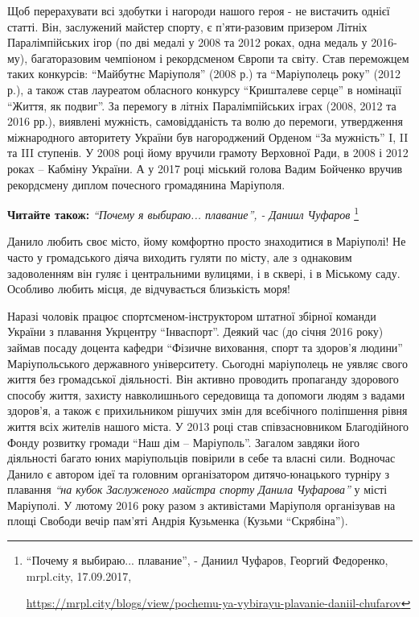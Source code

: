 
Щоб перерахувати всі здобутки і нагороди нашого героя - не вистачить однієї
статті. Він, заслужений майстер спорту, є п'яти\hyp{}разовим призером Літніх
Паралімпійських ігор (по дві медалі у 2008 та 2012 роках, одна медаль у
2016-му), багаторазовим чемпіоном і рекордсменом Європи та світу. Став
переможцем таких конкурсів: \enquote{Майбутнє Маріуполя} (2008 р.) та \enquote{Маріуполець
року} (2012 р.), а також став лауреатом обласного конкурсу \enquote{Кришталеве серце} в
номінації \enquote{Життя, як подвиг}. За перемогу в літніх Паралімпійських іграх (2008,
2012 та 2016 рр.), виявлені мужність, самовідданість та волю до перемоги,
утвердження міжнародного авторитету України був нагороджений Орденом \enquote{За
мужність} I, II та III ступенів. У 2008 році йому вручили грамоту Верховної
Ради, в 2008 і 2012 роках – Кабміну України. А у 2017 році міський голова Вадим
Бойченко вручив рекордсмену диплом почесного громадянина Маріуполя.

\textbf{Читайте також:} \emph{\enquote{Почему я выбираю... плавание}, - Даниил Чуфаров}%
\footnote{\enquote{Почему я выбираю... плавание}, - Даниил Чуфаров, Георгий Федоренко, mrpl.city, 17.09.2017, \par%
\url{https://mrpl.city/blogs/view/pochemu-ya-vybirayu-plavanie-daniil-chufarov}
}

Данило любить своє місто, йому комфортно просто знаходитися в Маріуполі! Не
часто у громадського діяча виходить гуляти по місту, але з однаковим
задоволенням він гуляє і центральними вулицями, і в сквері, і в Міському саду.
Особливо любить місця, де відчувається близькість моря!


Наразі чоловік працює спортсменом-інструктором штатної збірної команди України
з плавання Укрцентру \enquote{Інваспорт}. Деякий час (до січня 2016 року) займав посаду
доцента кафедри \enquote{Фізичне виховання, спорт та здоров'я людини} Маріупольського
державного університету. Сьогодні маріуполець не уявляє свого життя без
громадської діяльності. Він активно проводить пропаганду здорового способу
життя, захисту навколишнього середовища та допомоги людям з вадами здоров'я, а
також є прихильником рішучих змін для всебічного поліпшення рівня життя всіх
жителів нашого міста. У 2013 році став співзасновником Благодійного Фонду
розвитку громади \enquote{Наш дім – Маріуполь}. Загалом завдяки його діяльності багато
юних маріупольців повірили в себе та власні сили. Водночас Данило є автором
ідеї та головним організатором дитячо-юнацького турніру з плавання \emph{\enquote{на кубок
Заслуженого майстра спорту Данила Чуфарова}} у місті Маріуполі. У лютому 2016
року разом з активістами Маріуполя організував на площі Свободи вечір пам'яті
Андрія Кузьменка (Кузьми \enquote{Скрябіна}).

